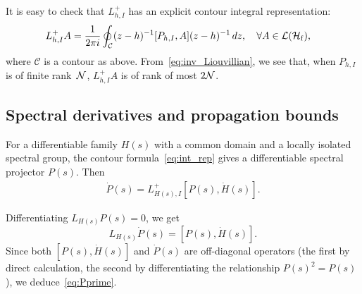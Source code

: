 \documentclass[a4paper,11pt]{article}
\theoremstyle{plain}
\theoremstyle{remark}
\begin{document}
It is easy to check that $L_{h,I}^{+}$ has an explicit contour integral
representation:
\begin{align}
&L_{h,I}^{+} A=  \frac{1}{2\pi i} \oint_{\mathcal C} (z-h)^{-1} [P_{h,I},A]  (z-h)^{-1} \, dz,  \quad \forall A \in {\cal L}(\mathcal H_{\rm f}),  \label{eq:inv_Liouvillian}
\end{align}
where $\mathcal C$ is a contour as above. From~\eqref{eq:inv_Liouvillian}, we see that, when $P_{h,I}$ is of finite rank~$\cal N$, $L_{h,I}^+A$ is of rank of most $2{\cal N}$.


\subsection{Spectral derivatives and propagation bounds}
For a differentiable family $H(s)$ with a common domain and a locally
isolated spectral group, the contour formula~\eqref{eq:int_rep} gives
a differentiable spectral projector $P(s)$. Then
\begin{align}\label{eq:Pprime}
\dot P(s)=L_{H(s),I}^{+}[P(s),\dot H(s)].
\end{align}

  Differentiating $L_{H(s)} P(s) = 0$, we get
\[
  L_{H(s)} \dot{P}(s) = [P(s), \dot{H}(s)].
\]
Since both $[P(s), \dot{H}(s)]$ and $\dot{P}(s)$ are
off-diagonal operators (the first by direct calculation, the second by
differentiating the relationship $P(s)^{2} = P(s)$), we deduce~\eqref{eq:Pprime}.
\end{document}
